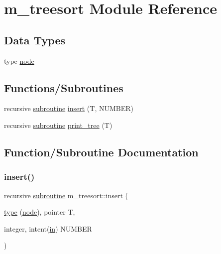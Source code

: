 \hypertarget{namespacem__treesort}{}\section{m\+\_\+treesort Module Reference}
\label{namespacem__treesort}
\subsection*{Data Types}
\begin{DoxyCompactItemize}
\item 
type \hyperlink{structm__treesort_1_1node}{node}
\end{DoxyCompactItemize}
\subsection*{Functions/\+Subroutines}
\begin{DoxyCompactItemize}
\item 
recursive \hyperlink{M__stopwatch_83_8txt_acfbcff50169d691ff02d4a123ed70482}{subroutine} \hyperlink{namespacem__treesort_a98f5c84e643f81e068aec72ac569c3d1}{insert} (T, N\+U\+M\+B\+ER)
\item 
recursive \hyperlink{M__stopwatch_83_8txt_acfbcff50169d691ff02d4a123ed70482}{subroutine} \hyperlink{namespacem__treesort_adbff3cab09e78694a914782b533e2732}{print\+\_\+tree} (T)
\end{DoxyCompactItemize}


\subsection{Function/\+Subroutine Documentation}
\mbox{\label{namespacem__treesort_a98f5c84e643f81e068aec72ac569c3d1}} 
\subsubsection{\texorpdfstring{insert()}{insert()}}
{\footnotesize\ttfamily recursive \hyperlink{M__stopwatch_83_8txt_acfbcff50169d691ff02d4a123ed70482}{subroutine} m\+\_\+treesort\+::insert (\begin{DoxyParamCaption}\item[{\hyperlink{stop__watch_83_8txt_a70f0ead91c32e25323c03265aa302c1c}{type} (\hyperlink{structm__treesort_1_1node}{node}), pointer}]{T,  }\item[{integer, intent(\hyperlink{M__journal_83_8txt_afce72651d1eed785a2132bee863b2f38}{in})}]{N\+U\+M\+B\+ER }\end{DoxyParamCaption})}




